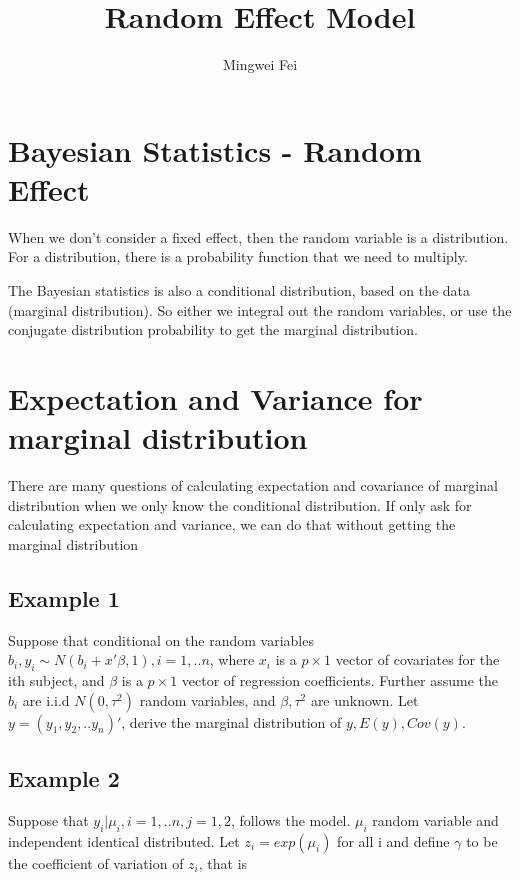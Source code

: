 \documentclass[11pt]{article} %
\title{Random Effect Model}
\author{Mingwei Fei}
\begin{document}
\maketitle

\section{Bayesian Statistics - Random Effect}
When we don't consider a fixed effect, then the random variable is a distribution. For a distribution, there is a probability function that we need to multiply. 

The Bayesian statistics is also a conditional distribution, based on the data (marginal distribution). So either we integral out the random variables, or use the conjugate distribution probability to get the marginal distribution.


\section{Expectation and Variance for marginal distribution}

There are many questions of calculating expectation and covariance of marginal distribution when we only know the conditional distribution. If only ask for calculating expectation and variance, we can do that without getting the marginal distribution

\subsection{Example 1}
Suppose that conditional on the random variables $b_i, y_i \sim N(b_i + x'\beta, 1), i=1,..n$, where $x_i$ is a $p \times 1$ vector of covariates for the ith subject, and $\beta$ is a $p \times 1$ vector of regression coefficients. Further assume the $b_i$ are i.i.d $N(0, \tau^2)$ random variables, and $\beta, \tau^2$ are unknown. Let $y= (y_1, y_2, .. y_n)'$, derive the marginal distribution of $y, E(y), Cov(y)$. 






\subsection{Example 2}
Suppose that $y_i| \mu_i, i=1,..n, j=1,2$, follows the model. $\mu_i$ random variable and independent identical distributed. Let $z_i = exp(\mu_i)$ for all i and define $\gamma$ to be the coefficient of variation of $z_i$, that is
\end{document}
